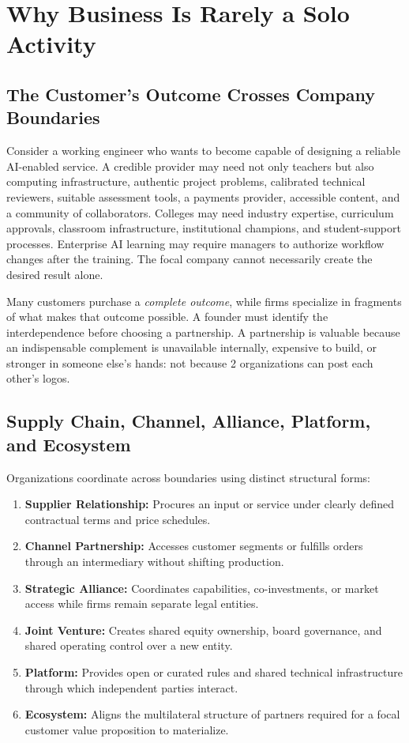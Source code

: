 \section{Why Business Is Rarely a Solo Activity}
\label{sec:ch30_why_business_rarely_solo}

\subsection{The Customer's Outcome Crosses Company Boundaries}
\label{sec:customer_outcome_crosses_boundaries}

Consider a working engineer who wants to become capable of designing a reliable AI-enabled service. A credible provider may need not only teachers but also computing infrastructure, authentic project problems, calibrated technical reviewers, suitable assessment tools, a payments provider, accessible content, and a community of collaborators. Colleges may need industry expertise, curriculum approvals, classroom infrastructure, institutional champions, and student-support processes. Enterprise AI learning may require managers to authorize workflow changes after the training. The focal company cannot necessarily create the desired result alone.

Many customers purchase a \textit{complete outcome}, while firms specialize in fragments of what makes that outcome possible. A founder must identify the interdependence before choosing a partnership. A partnership is valuable because an indispensable complement is unavailable internally, expensive to build, or stronger in someone else's hands: not because 2 organizations can post each other's logos.

\subsection{Supply Chain, Channel, Alliance, Platform, and Ecosystem}
\label{sec:distinguishing_alliance_platform_ecosystem}

Organizations coordinate across boundaries using distinct structural forms:
\begin{enumerate}
\item \textbf{Supplier Relationship:} Procures an input or service under clearly defined contractual terms and price schedules.
\item \textbf{Channel Partnership:} Accesses customer segments or fulfills orders through an intermediary without shifting production.
\item \textbf{Strategic Alliance:} Coordinates capabilities, co-investments, or market access while firms remain separate legal entities.
\item \textbf{Joint Venture:} Creates shared equity ownership, board governance, and shared operating control over a new entity.
\item \textbf{Platform:} Provides open or curated rules and shared technical infrastructure through which independent parties interact.
\item \textbf{Ecosystem:} Aligns the multilateral structure of partners required for a focal customer value proposition to materialize.
\end{enumerate}

